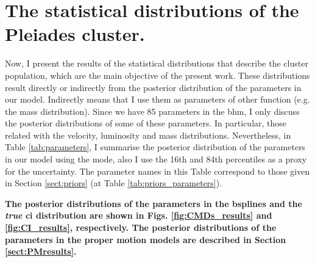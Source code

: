 \section{The statistical distributions of the Pleiades cluster.}
Now, I present the results of the statistical distributions that describe the cluster population, which are the main objective of the present work. These distributions result directly or indirectly from the posterior distribution of the parameters in our model. Indirectly means that I use them as parameters of other function (e.g. the mass distribution). Since we have 85 parameters in the \gls{bhm}, I only discuss the posterior distributions of some of these parameters. In particular, those related with the velocity, luminosity and mass distributions. Nevertheless, in Table \ref{tab:parameters}, I summarise the posterior distribution of the parameters in our model using the mode, also I use the 16th and 84th percentiles as a proxy for the uncertainty. The parameter names in this Table correspond to those given in Section \ref{sect:priors} (at Table \ref{tab:priors_parameters}). 

\textbf{The posterior distributions of the parameters in the \glspl{bspline} and the \emph{true} \gls{ci} distribution are shown in Figs. \ref{fig:CMDs_results} and \ref{fig:CI_results}, respectively.  The posterior distributions of the parameters in the proper motion models are described in Section \ref{sect:PMresults}.}

